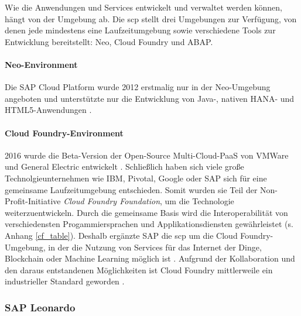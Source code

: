 \noindent Wie die Anwendungen und Services entwickelt und verwaltet werden können, hängt von der Umgebung ab. Die \ac{scp} stellt drei Umgebungen zur Verfügung, von denen jede mindestens eine Laufzeitumgebung sowie verschiedene Tools zur Entwicklung bereitstellt: Neo, Cloud Foundry und ABAP.

\paragraph{Neo-Environment} Die SAP Cloud Platform wurde 2012 erstmalig nur in der Neo-Umgebung angeboten und unterstützte nur die Entwicklung von Java-, nativen HANA- und HTML5-Anwendungen \citep{Elsner2018}.

\paragraph{Cloud Foundry-Environment} 2016 wurde die Beta-Version der Open-Source Multi-Cloud-PaaS von VMWare und General Electric entwickelt \citep{Utecht2018}. Schließlich haben sich viele große Technolgieunternehmen wie IBM, Pivotal, Google oder SAP sich für eine gemeinsame Laufzeitumgebung entschieden. Somit wurden sie Teil der Non-Profit-Initiative \textit{Cloud Foundry Foundation}, um die Technologie weiterzuentwickeln. Durch die gemeinsame Basis wird die Interoperabilität von verschiedensten Progammiersprachen und Applikationsdiensten gewährleistet (s. Anhang \ref{cf_table}).  Deshalb ergänzte SAP die \ac{scp} um die Cloud Foundry-Umgebung, in der die Nutzung von Services für das Internet der Dinge, Blockchain oder Machine Learning möglich ist \citep{Elsner2018}. Aufgrund der Kollaboration und den daraus entstandenen Möglichkeiten ist Cloud Foundry mittlerweile ein industrieller Standard geworden \citep{Acharya2019}.

\subsubsection{SAP Leonardo} \label{leo}

